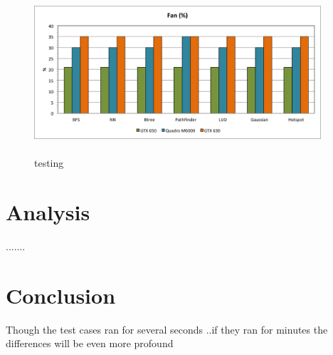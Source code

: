 \documentclass[paper=a4, fontsize=11pt]{scrartcl}
\numberwithin{equation}{section}		%
\numberwithin{figure}{section}			%
\numberwithin{table}{section}				%
\begin{document}
\begin{figure}[!h]
\centering
\includegraphics[width=0.95\textwidth,height=6cm]{../imgs/fan.png}
\caption{testing}
\label{??}
\end{figure}




\newpage
\section{Analysis}
.......


\newpage
\section{Conclusion}

Though the test cases ran for several seconds ..if they ran for minutes the differences will be even more profound
\end{document}
